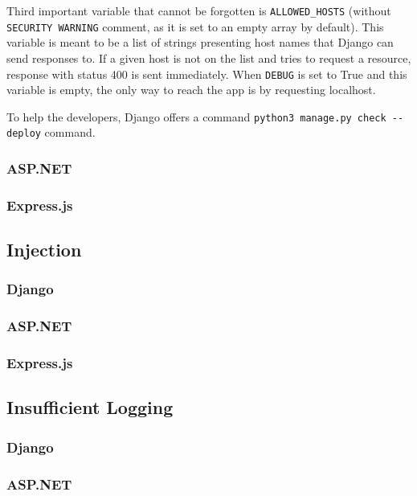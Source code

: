 Third important variable that cannot be forgotten is \lstinline{ALLOWED_HOSTS} (without \lstinline{SECURITY WARNING} comment, as it is set to an empty array by default). This variable is meant to be a list of strings presenting host names that Django can send responses to. If a given host is not on the list and tries to request a resource, response with status 400 is sent immediately. When \lstinline{DEBUG} is set to True and this variable is empty, the only way to reach the app is by requesting localhost.

To help the developers, Django offers a command \lstinline{python3 manage.py check --deploy} command.

\subsubsection{ASP.NET}
\subsubsection{Express.js}
\subsection{Injection}
\subsubsection{Django}
\subsubsection{ASP.NET}
\subsubsection{Express.js}
\subsection{Insufficient Logging}
\subsubsection{Django}
\subsubsection{ASP.NET}
